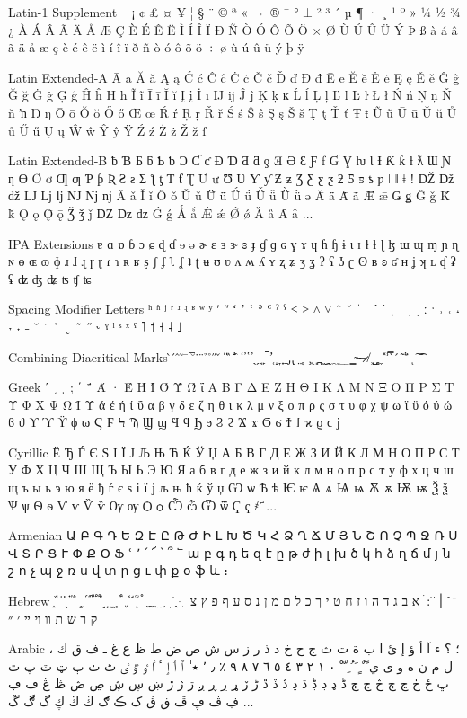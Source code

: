 \documentclass[12pt,twoside]{memoir}
\begin{document}
Latin-1 Supplement
  ¡ ¢ £ ¤ ¥ ¦ § ¨ © ª « ¬ ­ ® ¯ ° ± ² ³ ´ µ ¶ · ¸ ¹ º » ¼ ½ ¾ ¿ À Á Â Ã Ä Å Æ Ç È É Ê Ë Ì Í Î Ï Ð Ñ Ò Ó Ô Õ Ö × Ø Ù Ú Û Ü Ý Þ ß à á â ã ä å æ ç è é ê ë ì í î ï ð ñ ò ó ô õ ö ÷ ø ù ú û ü ý þ ÿ

Latin Extended-A
Ā ā Ă ă Ą ą Ć ć Ĉ ĉ Ċ ċ Č č Ď ď Đ đ Ē ē Ĕ ĕ Ė ė Ę ę Ě ě Ĝ ĝ Ğ ğ Ġ ġ Ģ ģ Ĥ ĥ Ħ ħ Ĩ ĩ Ī ī Ĭ ĭ Į į İ ı Ĳ ĳ Ĵ ĵ Ķ ķ ĸ Ĺ ĺ Ļ ļ Ľ ľ Ŀ ŀ Ł ł Ń ń Ņ ņ Ň ň ŉ Ŋ ŋ Ō ō Ŏ ŏ Ő ő Œ œ Ŕ ŕ Ŗ ŗ Ř ř Ś ś Ŝ ŝ Ş ş Š š Ţ ţ Ť ť Ŧ ŧ Ũ ũ Ū ū Ŭ ŭ Ů ů Ű ű Ų ų Ŵ ŵ Ŷ ŷ Ÿ Ź ź Ż ż Ž ž ſ

Latin Extended-B
ƀ Ɓ Ƃ ƃ Ƅ ƅ Ɔ Ƈ ƈ Ɖ Ɗ Ƌ ƌ ƍ Ǝ Ə Ɛ Ƒ ƒ Ɠ Ɣ ƕ Ɩ Ɨ Ƙ ƙ ƚ ƛ Ɯ Ɲ ƞ Ɵ Ơ ơ Ƣ ƣ Ƥ ƥ Ʀ Ƨ ƨ Ʃ ƪ ƫ Ƭ ƭ Ʈ Ư ư Ʊ Ʋ Ƴ ƴ Ƶ ƶ Ʒ Ƹ ƹ ƺ ƻ Ƽ ƽ ƾ ƿ ǀ ǁ ǂ ǃ Ǆ ǅ ǆ Ǉ ǈ ǉ Ǌ ǋ ǌ Ǎ ǎ Ǐ ǐ Ǒ ǒ Ǔ ǔ Ǖ ǖ Ǘ ǘ Ǚ ǚ Ǜ ǜ ǝ Ǟ ǟ Ǡ ǡ Ǣ ǣ Ǥ ǥ Ǧ ǧ Ǩ ǩ Ǫ ǫ Ǭ ǭ Ǯ ǯ ǰ Ǳ ǲ ǳ Ǵ ǵ Ǻ ǻ Ǽ ǽ Ǿ ǿ Ȁ ȁ Ȃ ȃ ...

IPA Extensions
ɐ ɑ ɒ ɓ ɔ ɕ ɖ ɗ ɘ ə ɚ ɛ ɜ ɝ ɞ ɟ ɠ ɡ ɢ ɣ ɤ ɥ ɦ ɧ ɨ ɩ ɪ ɫ ɬ ɭ ɮ ɯ ɰ ɱ ɲ ɳ ɴ ɵ ɶ ɷ ɸ ɹ ɺ ɻ ɼ ɽ ɾ ɿ ʀ ʁ ʂ ʃ ʄ ʅ ʆ ʇ ʈ ʉ ʊ ʋ ʌ ʍ ʎ ʏ ʐ ʑ ʒ ʓ ʔ ʕ ʖ ʗ ʘ ʙ ʚ ʛ ʜ ʝ ʞ ʟ ʠ ʡ ʢ ʣ ʤ ʥ ʦ ʧ ʨ

Spacing Modifier Letters
ʰ ʱ ʲ ʳ ʴ ʵ ʶ ʷ ʸ ʹ ʺ ʻ ʼ ʽ ʾ ʿ ˀ ˁ ˂ ˃ ˄ ˅ ˆ ˇ ˈ ˉ ˊ ˋ ˌ ˍ ˎ ˏ ː ˑ ˒ ˓ ˔ ˕ ˖ ˗ ˘ ˙ ˚ ˛ ˜ ˝ ˞ ˠ ˡ ˢ ˣ ˤ ˥ ˦ ˧ ˨ ˩

Combining Diacritical Marks
̀ ́ ̂ ̃ ̄ ̅ ̆ ̇ ̈ ̉ ̊ ̋ ̌ ̍ ̎ ̏ ̐ ̑ ̒ ̓ ̔ ̕ ̖ ̗ ̘ ̙ ̚ ̛ ̜ ̝ ̞ ̟ ̠ ̡ ̢ ̣ ̤ ̥ ̦ ̧ ̨ ̩ ̪ ̫ ̬ ̭ ̮ ̯ ̰ ̱ ̲ ̳ ̴ ̵ ̶ ̷ ̸ ̹ ̺ ̻ ̼ ̽ ̾ ̿ ̀ ́ ͂ ̓ ̈́ ͅ ͠ ͡

Greek
ʹ ͵ ͺ ; ΄ ΅ Ά · Έ Ή Ί Ό Ύ Ώ ΐ Α Β Γ Δ Ε Ζ Η Θ Ι Κ Λ Μ Ν Ξ Ο Π Ρ Σ Τ Υ Φ Χ Ψ Ω Ϊ Ϋ ά έ ή ί ΰ α β γ δ ε ζ η θ ι κ λ μ ν ξ ο π ρ ς σ τ υ φ χ ψ ω ϊ ϋ ό ύ ώ ϐ ϑ ϒ ϓ ϔ ϕ ϖ Ϛ Ϝ Ϟ Ϡ Ϣ ϣ Ϥ ϥ Ϧ ϧ Ϩ ϩ Ϫ ϫ Ϭ ϭ Ϯ ϯ ϰ ϱ ϲ ϳ

Cyrillic
Ё Ђ Ѓ Є Ѕ І Ї Ј Љ Њ Ћ Ќ Ў Џ А Б В Г Д Е Ж З И Й К Л М Н О П Р С Т У Ф Х Ц Ч Ш Щ Ъ Ы Ь Э Ю Я а б в г д е ж з и й к л м н о п р с т у ф х ц ч ш щ ъ ы ь э ю я ё ђ ѓ є ѕ і ї ј љ њ ћ ќ ў џ Ѡ ѡ Ѣ ѣ Ѥ ѥ Ѧ ѧ Ѩ ѩ Ѫ ѫ Ѭ ѭ Ѯ ѯ Ѱ ѱ Ѳ ѳ Ѵ ѵ Ѷ ѷ Ѹ ѹ Ѻ ѻ Ѽ ѽ Ѿ ѿ Ҁ ҁ ҂ ҃ ...

Armenian
Ա Բ Գ Դ Ե Զ Է Ը Թ Ժ Ի Լ Խ Ծ Կ Հ Ձ Ղ Ճ Մ Յ Ն Շ Ո Չ Պ Ջ Ռ Ս Վ Տ Ր Ց Ւ Փ Ք Օ Ֆ ՙ ՚ ՛ ՜ ՝ ՞ ՟ ա բ գ դ ե զ է ը թ ժ ի լ խ ծ կ հ ձ ղ ճ մ յ ն շ ո չ պ ջ ռ ս վ տ ր ց ւ փ ք օ ֆ և ։

Hebrew
֑ ֒ ֓ ֔ ֕ ֖ ֗ ֘ ֙ ֚ ֛ ֜ ֝ ֞ ֟ ֠ ֡ ֣ ֤ ֥ ֦ ֧ ֨ ֩ ֪ ֫ ֬ ֭ ֮ ֯ ְ ֱ ֲ ֳ ִ ֵ ֶ ַ ָ ֹ ֻ ּ ֽ ־ ֿ ׀ ׁ ׂ ׃ ׄ א ב ג ד ה ו ז ח ט י ך כ ל ם מ ן נ ס ע ף פ ץ צ ק ר ש ת װ ױ ײ ׳ ״

Arabic
، ؛ ؟ ء آ أ ؤ إ ئ ا ب ة ت ث ج ح خ د ذ ر ز س ش ص ض ط ظ ع غ ـ ف ق ك ل م ن ه و ى ي ً ٌ ٍ َ ُ ِ ّ ْ ٠ ١ ٢ ٣ ٤ ٥ ٦ ٧ ٨ ٩ ٪ ٫ ٬ ٭ ٰ ٱ ٲ ٳ ٴ ٵ ٶ ٷ ٸ ٹ ٺ ٻ ټ ٽ پ ٿ ڀ ځ ڂ ڃ ڄ څ چ ڇ ڈ ډ ڊ ڋ ڌ ڍ ڎ ڏ ڐ ڑ ڒ ړ ڔ ڕ ږ ڗ ژ ڙ ښ ڛ ڜ ڝ ڞ ڟ ڠ ڡ ڢ ڣ ڤ ڥ ڦ ڧ ڨ ک ڪ ګ ڬ ڭ ڮ گ ڰ ڱ ...
\end{document}

